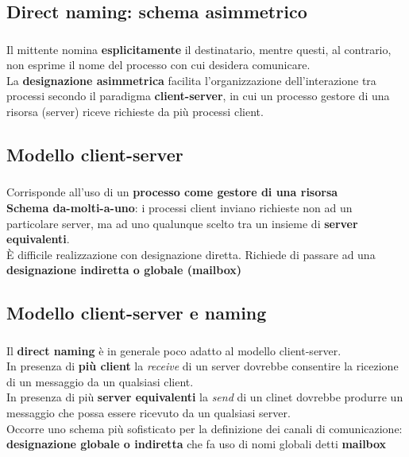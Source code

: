 \documentclass{beamer}
\newenvironment{mainframe}{
	\begin{frame}
		\frametitle{\insertsubsection}
		\framesubtitle{\insertsection}
	}{
	\end{frame}
}
\begin{document}
\subsection{Direct naming: schema asimmetrico}
\begin{mainframe}
	Il mittente nomina \textbf{esplicitamente} il destinatario, mentre questi, al contrario, non esprime il nome del processo con cui desidera comunicare.\\
	La \textbf{designazione asimmetrica} facilita l'organizzazione dell'interazione tra processi secondo il paradigma \textbf{client-server}, in cui un processo gestore di una risorsa (server) riceve richieste da più processi client.
\end{mainframe}
\subsection{Modello client-server}
\begin{mainframe}
	Corrisponde all'uso di un \textbf{processo come gestore di una risorsa}\\
	\textbf{Schema da-molti-a-uno}: i processi client inviano richieste non ad un particolare server, ma ad uno qualunque scelto tra un insieme di \textbf{server equivalenti}.\\
	È difficile realizzazione con designazione diretta. Richiede di passare ad una \textbf{designazione indiretta o globale (mailbox)}
\end{mainframe}
\subsection{Modello client-server e naming}
\begin{mainframe}
	Il \textbf{direct naming} è in generale poco adatto al modello client-server.\\
	In presenza di \textbf{più client} la \textit{receive} di un server dovrebbe consentire la ricezione di un messaggio da un qualsiasi client.\\
	In presenza di più \textbf{server equivalenti} la \textit{send} di un clinet dovrebbe produrre un messaggio che possa essere ricevuto da un qualsiasi server.\\
	Occorre uno schema più sofisticato per la definizione dei canali di comunicazione: \textbf{designazione globale o indiretta} che fa uso di nomi globali detti \textbf{mailbox}
\end{mainframe}
\end{document}
